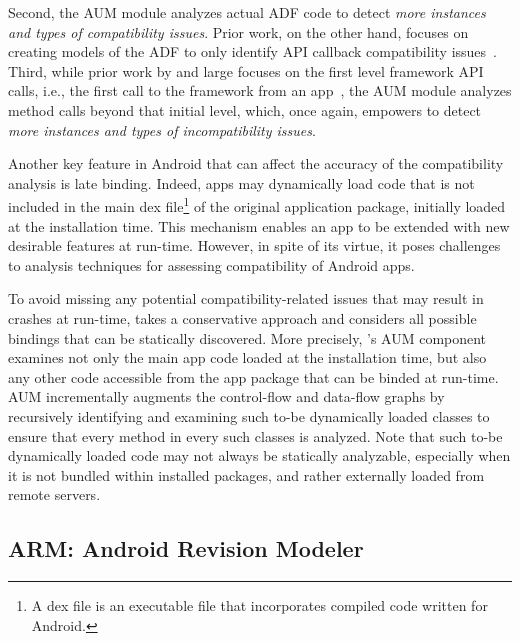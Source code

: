 
Second, the AUM module analyzes actual ADF code to detect
\emph{more instances and types of compatibility issues}.
Prior work, on the other hand, focuses on creating models of
the ADF to only identify API callback compatibility
issues~\cite{huang2018understanding}.  Third, while prior
work by and large focuses on the first level framework API
calls, i.e., the first call to the framework from an
app~\cite{lili2018cid}, the AUM module analyzes method calls
beyond that initial level, which, once again, empowers
\@approach to detect \emph{more instances and types of
incompatibility issues}. 

Another key feature in Android that can affect the accuracy
of the compatibility analysis is late binding.  Indeed, apps
may dynamically load code that is not included in the main
dex file\footnote{A dex file is an executable file that
incorporates compiled code written for Android.} of the
original application package, initially loaded at the
installation time.  This mechanism enables an app to be
extended with new desirable features at run-time. However,
in spite of its virtue, it poses challenges to analysis
techniques for assessing compatibility of Android apps.

To avoid missing any potential compatibility-related
issues that may result in crashes at run-time,
\@approach takes a conservative approach and considers
all possible bindings that can be statically
discovered.  More precisely, \@approach's AUM component
examines not only the main app code loaded at the
installation time, but also any other code accessible
from the app package that can be binded at run-time.
AUM incrementally augments the control-flow and
data-flow graphs by recursively identifying and
examining such to-be dynamically loaded classes to
ensure that every method in every such classes is
analyzed.  Note that such to-be dynamically loaded code
may not always be statically analyzable, especially
when it is not bundled within installed packages, and
rather externally loaded from remote servers.
  
\subsection{ARM: Android Revision Modeler} 

